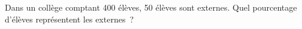 \documentclass[exercice]{thedocument}%
\begin{document}
%
Dans un collège comptant 400 élèves, 50 élèves sont externes. \vskip10pt
Quel pourcentage d'élèves représentent les externes~?
\end{document}
